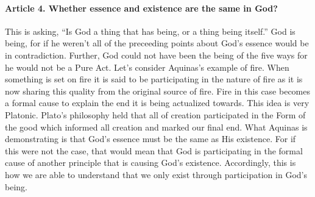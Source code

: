 \documentclass{ucetd}
\begin{document}
\paragraph{Article 4. Whether essence and existence are the same in God?}
This is asking, ``Is God a thing that has being, or a thing being itself.'' God is being, for if he weren't all of the preceeding points about God's essence would be in contradiction. Further, God could not have been the being of the five ways for he would not be a Pure Act. Let's consider Aquinas's example of fire. When something is set on fire it is said to be participating in the nature of fire as it is now sharing this quality from the original source of fire. Fire in this case becomes a formal cause to explain the end it is being actualized towards. This idea is very Platonic. Plato's philosophy held that all of creation participated in the Form of the good which informed all creation and marked our final end. What Aquinas is demonstrating is that God's essence must be the same as His existence. For if this were not the case, that would mean that God is participating in the formal cause of another principle that is causing God's existence. Accordingly, this is how we are able to understand that we only exist through participation in God's being.
\end{document}
